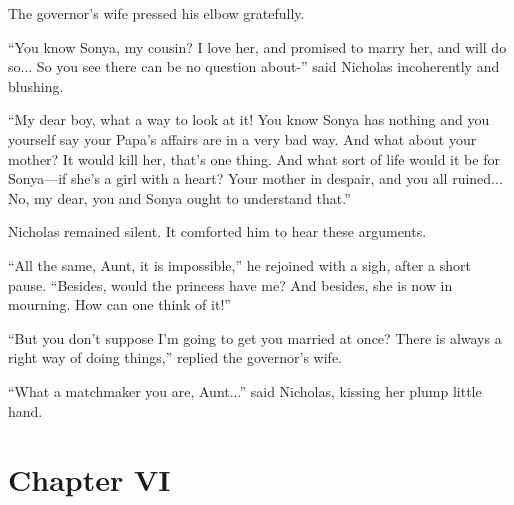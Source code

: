 The governor's wife pressed his elbow gratefully.

``You know Sonya, my cousin? I love her, and promised to marry
her, and will do so... So you see there can be no question
about-'' said Nicholas incoherently and blushing.

``My dear boy, what a way to look at it! You know Sonya has
nothing and you yourself say your Papa's affairs are in a very
bad way. And what about your mother? It would kill her, that's
one thing. And what sort of life would it be for Sonya---if she's
a girl with a heart? Your mother in despair, and you all
ruined... No, my dear, you and Sonya ought to understand that.''

Nicholas remained silent. It comforted him to hear these
arguments.

``All the same, Aunt, it is impossible,'' he rejoined with a
sigh, after a short pause. ``Besides, would the princess have me?
And besides, she is now in mourning. How can one think of it!''

``But you don't suppose I'm going to get you married at once?
There is always a right way of doing things,'' replied the
governor's wife.

``What a matchmaker you are, Aunt...'' said Nicholas, kissing her
plump little hand.


\chapter*{Chapter VI} \ifaudio {}
\fi

